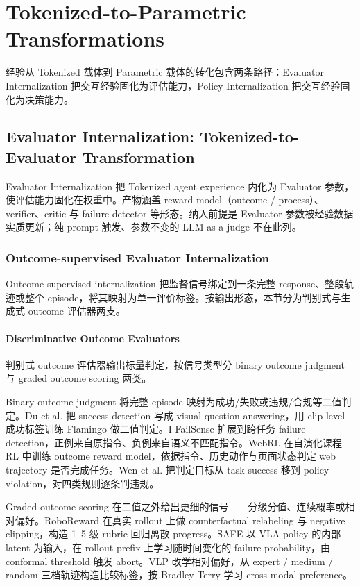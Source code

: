 \section{Tokenized-to-Parametric Transformations}

经验从 Tokenized 载体到 Parametric 载体的转化包含两条路径：Evaluator Internalization 把交互经验固化为评估能力，Policy Internalization 把交互经验固化为决策能力。

\subsection{Evaluator Internalization: Tokenized-to-Evaluator Transformation}

Evaluator Internalization 把 Tokenized agent experience 内化为 Evaluator 参数，使评估能力固化在权重中。产物涵盖 reward model（outcome / process）、verifier、critic 与 failure detector 等形态。纳入前提是 Evaluator 参数被经验数据实质更新；纯 prompt 触发、参数不变的 LLM-as-a-judge 不在此列。

\subsubsection{Outcome-supervised Evaluator Internalization}

Outcome-supervised internalization 把监督信号绑定到一条完整 response、整段轨迹或整个 episode，将其映射为单一评价标签。按输出形态，本节分为判别式与生成式 outcome 评估器两支。

\paragraph{Discriminative Outcome Evaluators}

判别式 outcome 评估器输出标量判定，按信号类型分 binary outcome judgment 与 graded outcome scoring 两类。

Binary outcome judgment 将完整 episode 映射为成功/失败或违规/合规等二值判定。Du et al. \cite{Du23} 把 success detection 写成 visual question answering，用 clip-level 成功标签训练 Flamingo 做二值判定。I-FailSense \cite{Gri25} 扩展到跨任务 failure detection，正例来自原指令、负例来自语义不匹配指令。WebRL \cite{Qi24} 在自演化课程 RL 中训练 outcome reward model，依据指令、历史动作与页面状态判定 web trajectory 是否完成任务。Wen et al. \cite{Wen25b} 把判定目标从 task success 移到 policy violation，对四类规则逐条判违规。

Graded outcome scoring 在二值之外给出更细的信号——分级分值、连续概率或相对偏好。RoboReward \cite{Lee26b} 在真实 rollout 上做 counterfactual relabeling 与 negative clipping，构造 1–5 级 rubric 回归离散 progress。SAFE \cite{Gu25b} 以 VLA policy 的内部 latent 为输入，在 rollout prefix 上学习随时间变化的 failure probability，由 conformal threshold 触发 abort。VLP \cite{Liu25w} 改学相对偏好，从 expert / medium / random 三档轨迹构造比较标签，按 Bradley-Terry 学习 cross-modal preference。

